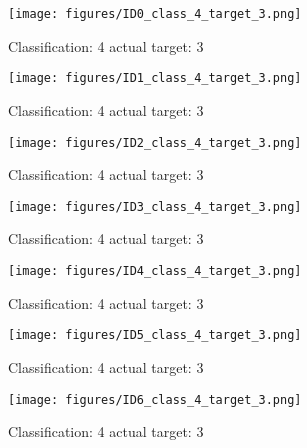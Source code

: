 \begin{figure}[h!]
\begin{center}
\texttt{[image: figures/ID0\_class\_4\_target\_3.png]}
\end{center}
\caption{ Classification: 4 actual target: 3}
\label{fig:ID0_class_4_target_3}
\end{figure}
\begin{figure}[h!]
\begin{center}
\texttt{[image: figures/ID1\_class\_4\_target\_3.png]}
\end{center}
\caption{ Classification: 4 actual target: 3}
\label{fig:ID1_class_4_target_3}
\end{figure}
\begin{figure}[h!]
\begin{center}
\texttt{[image: figures/ID2\_class\_4\_target\_3.png]}
\end{center}
\caption{ Classification: 4 actual target: 3}
\label{fig:ID2_class_4_target_3}
\end{figure}
\begin{figure}[h!]
\begin{center}
\texttt{[image: figures/ID3\_class\_4\_target\_3.png]}
\end{center}
\caption{ Classification: 4 actual target: 3}
\label{fig:ID3_class_4_target_3}
\end{figure}
\begin{figure}[h!]
\begin{center}
\texttt{[image: figures/ID4\_class\_4\_target\_3.png]}
\end{center}
\caption{ Classification: 4 actual target: 3}
\label{fig:ID4_class_4_target_3}
\end{figure}
\begin{figure}[h!]
\begin{center}
\texttt{[image: figures/ID5\_class\_4\_target\_3.png]}
\end{center}
\caption{ Classification: 4 actual target: 3}
\label{fig:ID5_class_4_target_3}
\end{figure}
\begin{figure}[h!]
\begin{center}
\texttt{[image: figures/ID6\_class\_4\_target\_3.png]}
\end{center}
\caption{ Classification: 4 actual target: 3}
\label{fig:ID6_class_4_target_3}
\end{figure}
